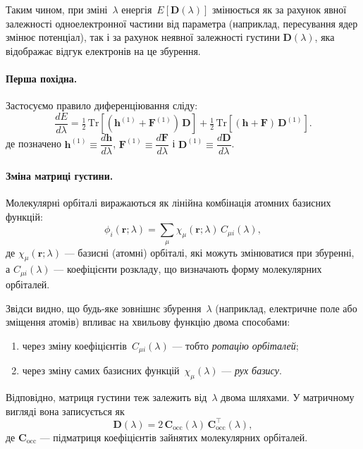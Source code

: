 Таким чином, при зміні~$\lambda$ енергія~$E[\mathbf D(\lambda)]$
змінюється як за рахунок явної залежності одноелектронної частини від параметра
(наприклад, пересування ядер змінює потенціал),
так і за рахунок неявної залежності густини $\mathbf D(\lambda)$,
яка відображає відгук електронів на це збурення.



\paragraph{Перша похідна.}
Застосуємо правило диференціювання сліду:
\begin{equation}\label{eq:dedlambda}
\frac{dE}{d\lambda}
= \tfrac{1}{2}\,\mathrm{Tr} \left[(\mathbf h^{(1)} + \mathbf F^{(1)})\,\mathbf D\right]
+ \tfrac{1}{2}\,\mathrm{Tr} \left[(\mathbf h + \mathbf F)\,\mathbf D^{(1)}\right].
\end{equation}
де позначено \(\mathbf h^{(1)}\equiv\dfrac{d\mathbf h}{d\lambda}\), \(\mathbf F^{(1)}\equiv\dfrac{d\mathbf F}{d\lambda}\) і \(\mathbf D^{(1)}\equiv\dfrac{d\mathbf D}{d\lambda}\).

\paragraph{Зміна матриці густини.}

Молекулярні орбіталі виражаються як лінійна комбінація атомних базисних функцій:
\[
\phi_i(\mathbf r;\lambda)
= \sum_\mu \chi_\mu(\mathbf r;\lambda)\,C_{\mu i}(\lambda),
\]
де $\chi_\mu(\mathbf r;\lambda)$ --- базисні (атомні) орбіталі, які можуть змінюватися при збуренні,
а $C_{\mu i}(\lambda)$ --- коефіцієнти розкладу, що визначають форму молекулярних орбіталей.

Звідси видно, що будь-яке зовнішнє збурення~$\lambda$
(наприклад, електричне поле або зміщення атомів)
впливає на хвильову функцію двома способами:
\begin{enumerate}
  \item через зміну коефіцієнтів~$C_{\mu i}(\lambda)$ --- тобто \emph{ротацію орбіталей};
  \item через зміну самих базисних функцій~$\chi_\mu(\lambda)$ --- \emph{рух базису}.
\end{enumerate}

Відповідно, матриця густини теж залежить від~$\lambda$ двома шляхами.
У матричному вигляді вона записується як
\[
\mathbf D(\lambda) = 2\,\mathbf C_{\text{occ}}(\lambda)\,\mathbf C_{\text{occ}}^\top(\lambda),
\]
де $\mathbf C_{\text{occ}}$ --- підматриця коефіцієнтів зайнятих молекулярних орбіталей.

